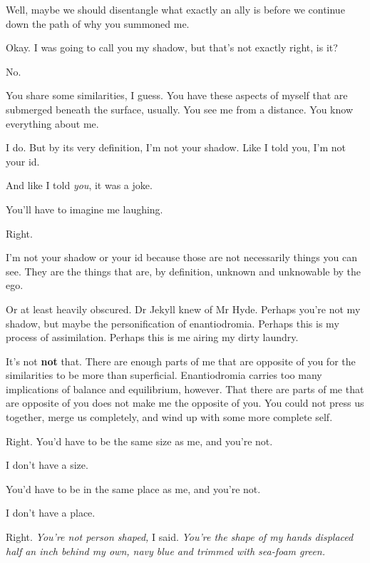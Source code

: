 \begin{paracol}{2}
\begin{leftcolumn}
\begin{ally}
Well, maybe we should disentangle what exactly an ally is before we continue down the path of why you summoned me.
\end{ally}
Okay. I was going to call you my shadow, but that's not exactly right, is it?

\begin{ally}
No.
\end{ally}
You share some similarities, I guess. You have these aspects of myself that are submerged beneath the surface, usually. You see me from a distance. You know everything about me.

\begin{ally}
I do. But by its very definition, I'm not your shadow. Like I told you, I'm not your id.
\end{ally}
And like I told \emph{you}, it was a joke.

\begin{ally}
You'll have to imagine me laughing.
\end{ally}
Right.

\begin{ally}
I'm not your shadow or your id because those are not necessarily things you can see. They are the things that are, by definition, unknown and unknowable by the ego.
\end{ally}
Or at least heavily obscured. Dr Jekyll knew of Mr Hyde. Perhaps you're not my shadow, but maybe the personification of enantiodromia. Perhaps this is my process of assimilation. Perhaps this is me airing my dirty laundry.

\begin{ally}
It's not \textbf{not} that. There are enough parts of me that are opposite of you for the similarities to be more than superficial. Enantiodromia carries too many implications of balance and equilibrium, however. That there are parts of me that are opposite of you does not make me the opposite of you. You could not press us together, merge us completely, and wind up with some more complete self.
\end{ally}
Right. You'd have to be the same size as me, and you're not.

\begin{ally}
I don't have a size.
\end{ally}
You'd have to be in the same place as me, and you're not.

\begin{ally}
I don't have a place.
\end{ally}
Right. \emph{You're not person shaped,} I said. \emph{You're the shape of my hands displaced half an inch behind my own, navy blue and trimmed with sea-foam green.}


\end{leftcolumn}
\end{paracol}
